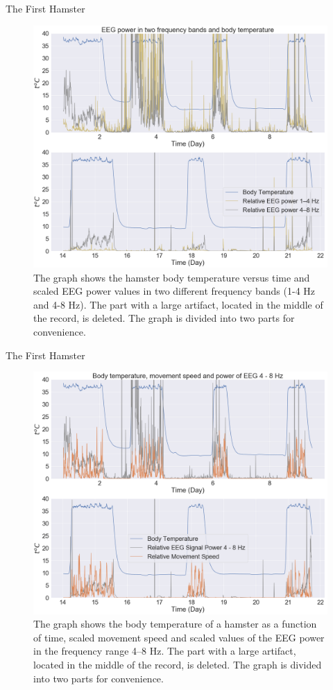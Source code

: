 \documentclass[10pt]{beamer}
\begin{document}
\begin{frame}[fragile]{The First Hamster}
\begin{figure}[H]
\centering
\includegraphics[width=0.7\linewidth]{exp1_3.png}
\caption{The graph shows the hamster body temperature versus time and scaled EEG power values ​​in two different frequency bands (1-4 Hz and 4-8 Hz). The part with a large artifact, located in the middle of the record, is deleted. The graph is divided into two parts for convenience.}\label{fig:lactate_receptors}
\end{figure}
\end{frame}

\begin{frame}[fragile]{The First Hamster}
\begin{figure}[H]
\centering
\includegraphics[width=0.7\linewidth]{exp1_4.png}
\caption{The graph shows the body temperature of a hamster as a function of time, scaled movement speed and scaled values ​​of the EEG power in the frequency range 4--8 Hz. The part with a large artifact, located in the middle of the record, is deleted. The graph is divided into two parts for convenience.}\label{fig:lactate_receptors}
\end{figure}
\end{frame}
\end{document}
